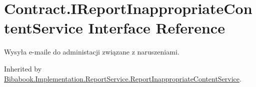\hypertarget{interface_contract_1_1_i_report_inappropriate_content_service}{}\section{Contract.\+I\+Report\+Inappropriate\+Content\+Service Interface Reference}
\label{interface_contract_1_1_i_report_inappropriate_content_service}


Wysyła e-\/maile do administacji związane z naruszeniami.  




Inherited by \hyperlink{class_bibabook_1_1_implementation_1_1_report_service_1_1_report_inappropriate_content_service}{Bibabook.\+Implementation.\+Report\+Service.\+Report\+Inappropriate\+Content\+Service}.

